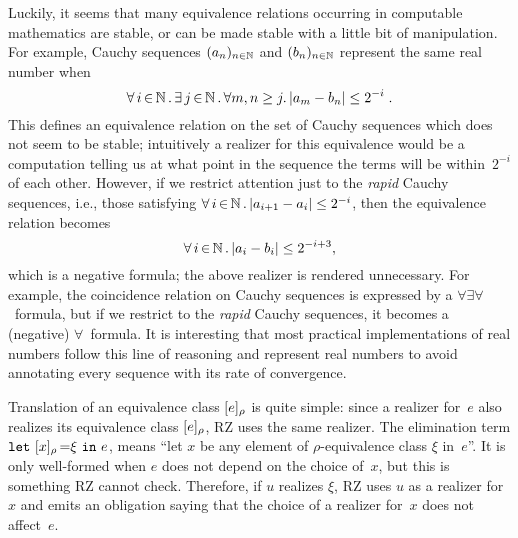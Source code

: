 Luckily, it seems that many equivalence relations occurring in
computable mathematics are stable, or can be made stable with a little
bit of manipulation.
%
\iflong
For example, Cauchy sequences $(a_n)_{n\in\mathbb{N}}$
and $(b_n)_{n\in\mathbb{N}}$ represent the same real number when
%
\begin{equation}
  \label{eq:cauchy}%
  \xall{i}{\NN}{
    \xsome{j}{\NN}{
      \forall m,n \geq j.\,|a_m - b_n| \leq 2^{-i}
    }
  } \;.
\end{equation}
%
This defines an equivalence relation on the set of Cauchy sequences
which does not seem to be stable; intuitively a realizer for this
equivalence would be a computation telling us at what point
in the sequence the terms will be within~$2^{-i}$ of each other.
%
However, if we restrict attention just to the \emph{rapid} Cauchy
sequences, i.e., those satisfying $\forall\, i \,{\in}\, \mathbb{N}\,.\,|a_{i+1} - a_i| \leq
  2^{-i}$, then the equivalence relation becomes
%
\begin{equation*}
  \forall\, i \,{\in}\, \mathbb{N}\,.\,|a_i - b_i| \leq 2^{-i+3},
\end{equation*}
%
which is a negative formula; the above realizer is rendered
unnecessary.
%
\else %
%
For example, the coincidence relation on Cauchy sequences is expressed
by a $\forall\exists\forall$~formula, but if we restrict to the
\emph{rapid} Cauchy sequences, it becomes a (negative)
$\forall$~formula.
%
\fi %
It is interesting that most practical implementations of
real numbers follow this line of reasoning and represent real numbers to
avoid annotating every sequence with its rate of convergence.

Translation of an equivalence class $[e]_{\rho}$ is quite
simple: since a realizer for~$e$ also realizes its equivalence class
$[e]_{\rho}$, RZ uses the same realizer. The elimination term
$\texttt{let}\ [x]_{\rho}\,{=}\xi\ \texttt{in}\ e$, means ``let $x$ be any element of
$\rho$-equivalence class $\xi$ in~$e$''. It is only well-formed when
$e$ does not depend on the choice of~$x$, but this is something RZ
cannot check. Therefore, if $u$ realizes $\xi$, RZ uses $u$ as a
realizer for~$x$ and emits an obligation saying that the choice of a
realizer for~$x$ does not affect~$e$.

